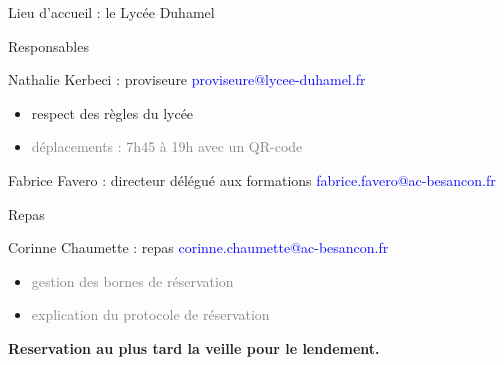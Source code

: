 \documentclass [xcolor=x11names,t] {beamer}
\begin{document}
\begin{frame}{Lieu d'accueil : le Lycée Duhamel}

\begin{block}{Responsables}


Nathalie Kerbeci : proviseure \textcolor{blue}{proviseure@lycee-duhamel.fr}    
\begin{itemize}
    \item \textcolor{gray!50!red}{respect des règles du lycée}
    \item \textcolor{gray}{déplacements : 7h45 à 19h avec un QR-code}

\end{itemize}


Fabrice Favero : directeur délégué aux formations \textcolor{blue}{fabrice.favero@ac-besancon.fr}    


\end{block}

\begin{alertblock}{Repas}

Corinne Chaumette : repas \textcolor{blue}{corinne.chaumette@ac-besancon.fr}    
\begin{itemize}
    \item \textcolor{gray}{gestion des bornes de réservation}
    \item \textcolor{gray}{explication du protocole de réservation}
\end{itemize}
\textbf{Reservation au plus tard la veille pour le lendement.}
\end{alertblock}



\end{frame}
\end{document}
